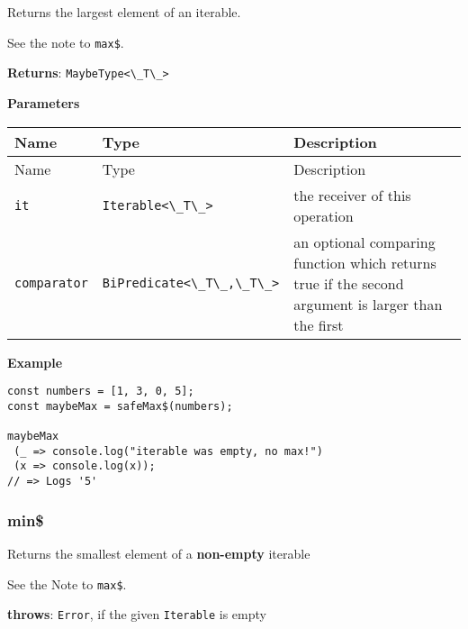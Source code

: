 Returns the largest element of an iterable.

See the note to \passthrough{\lstinline!max$!}.

\textbf{Returns}: \passthrough{\lstinline!MaybeType<\_T\_>!}

\textbf{Parameters}

\begin{longtable}[]{
  >{\raggedright\arraybackslash}p{}
  >{\raggedright\arraybackslash}p{}
  >{\raggedright\arraybackslash}p{}@{}}

\toprule\noalign{}
Name & Type & Description \\
\midrule\noalign{}
\endfirsthead
\toprule\noalign{}
Name & Type & Description \\
\midrule\noalign{}
\endhead
\bottomrule\noalign{}
\endlastfoot
\passthrough{\lstinline!it!} & \passthrough{\lstinline!Iterable<\_T\_>!}
& the receiver of this operation \\
\passthrough{\lstinline!comparator!} &
\passthrough{\lstinline!BiPredicate<\_T\_,\_T\_>!} & an optional
comparing function which returns true if the second argument is larger
than the first \\
\end{longtable}

\textbf{Example}

\begin{lstlisting}[label=7b86eb50-6997-4099-a79d-0a699d114077]
const numbers = [1, 3, 0, 5];
const maybeMax = safeMax$(numbers);
                                                 
maybeMax
 (_ => console.log("iterable was empty, no max!")
 (x => console.log(x));
// => Logs '5'
\end{lstlisting}

\hypertarget{4262f292-d5a6-4e34-acfa-e4a74506c1c1}{%
\subsubsection{min\$}\label{4262f292-d5a6-4e34-acfa-e4a74506c1c1}}

Returns the smallest element of a \textbf{non-empty} iterable

See the Note to \passthrough{\lstinline!max$!}.

\textbf{throws}: \passthrough{\lstinline!Error!}, if the given
\passthrough{\lstinline!Iterable!} is empty

